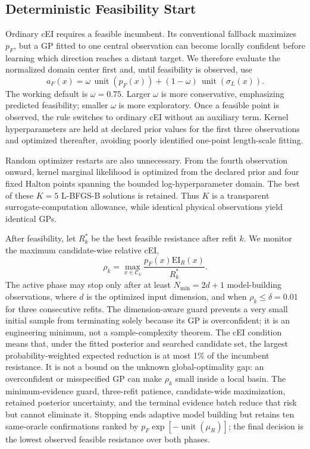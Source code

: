 \documentclass[conference]{IEEEtran}
\begin{document}
\subsection{Deterministic Feasibility Start}
Ordinary cEI requires a feasible incumbent. Its conventional fallback maximizes $p_F$, but a GP fitted to one central observation can become locally confident before learning which direction reaches a distant target. We therefore evaluate the normalized domain center first and, until feasibility is observed, use
\begin{equation}
 a_F(x)=\omega\,\operatorname{unit}(p_F(x))
 +(1-\omega)\,\operatorname{unit}(\sigma_L(x)).
 \label{eq:feasibility-start}
\end{equation}
The working default is $\omega=0.75$. Larger $\omega$ is more conservative, emphasizing predicted feasibility; smaller $\omega$ is more exploratory. Once a feasible point is observed, the rule switches to ordinary cEI without an auxiliary term. Kernel hyperparameters are held at declared prior values for the first three observations and optimized thereafter, avoiding poorly identified one-point length-scale fitting.

Random optimizer restarts are also unnecessary. From the fourth observation onward, kernel marginal likelihood is optimized from the declared prior and four fixed Halton points spanning the bounded log-hyperparameter domain. The best of these $K=5$ L-BFGS-B solutions is retained. Thus $K$ is a transparent surrogate-computation allowance, while identical physical observations yield identical GPs.

After feasibility, let $R_k^*$ be the best feasible resistance after refit $k$. We monitor the maximum candidate-wise relative cEI,
\begin{equation}
 \rho_k=\max_{x\in\mathcal C_k}
 \frac{p_F(x)\mathrm{EI}_R(x)}{R_k^*}.
 \label{eq:stopping}
\end{equation}
The active phase may stop only after at least $N_{\min}=2d+1$ model-building observations, where $d$ is the optimized input dimension, and when $\rho_k\leq\delta=0.01$ for three consecutive refits. The dimension-aware guard prevents a very small initial sample from terminating solely because its GP is overconfident; it is an engineering minimum, not a sample-complexity theorem. The cEI condition means that, under the fitted posterior and searched candidate set, the largest probability-weighted expected reduction is at most 1\% of the incumbent resistance. It is not a bound on the unknown global-optimality gap: an overconfident or misspecified GP can make $\rho_k$ small inside a local basin. The minimum-evidence guard, three-refit patience, candidate-wide maximization, retained posterior uncertainty, and the terminal evidence batch reduce that risk but cannot eliminate it. Stopping ends adaptive model building but retains ten same-oracle confirmations ranked by $p_F\exp[-\operatorname{unit}(\mu_R)]$; the final decision is the lowest observed feasible resistance over both phases.
\end{document}
